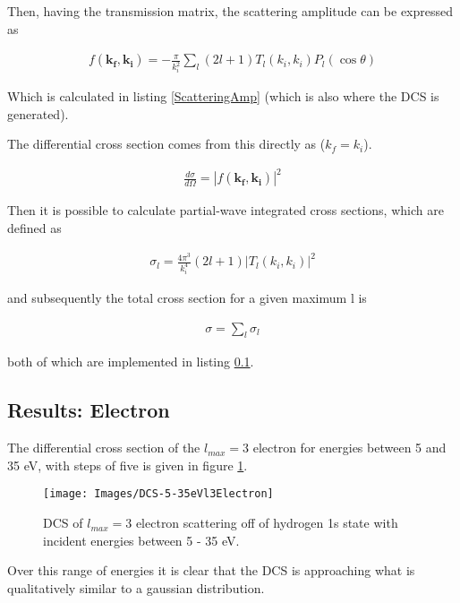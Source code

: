 \documentclass{article}
\renewcommand{\vec}[1]{\mathbf{#1}}
\begin{document}
    Then, having the transmission matrix, the scattering amplitude can be expressed as
    
    \begin{gather}
    	f(\vec{k_f}, \vec{k_i}) = -\frac{\pi}{k_i^2}\sum_{l}(2l+1)T_l(k_i, k_i)P_l(\cos\theta)
    \end{gather}
    
    Which is calculated in listing \ref{ScatteringAmp} (which is also where the DCS is generated).
    
    The differential cross section comes from this directly as ($k_f = k_i$). 
    
    \begin{gather}
    	\frac{d\sigma}{d\Omega} = |f(\vec{k_f}, \vec{k_i})|^2
    \end{gather}
    
    Then it is possible to calculate partial-wave integrated cross sections, which are defined as 
    
    \begin{gather}
    	\sigma_l = \frac{4\pi^3}{k_i^4}(2l+1)|T_l(k_i, k_i)|^2
    \end{gather}
    
    and subsequently the total cross section for a given maximum l is 
    
    \begin{gather}
    	\sigma = \sum_l \sigma_l    
    \end{gather}
    
    both of which are implemented in listing \ref{}. 
    
    \subsection{Results: Electron}
    
    The differential cross section of the $l_{max}=3$ electron for energies between 5 and 35 eV, with steps of five is given in figure \ref{5-35l3Electron}. 
    
    \begin{figure}[H]
    	\centering
    	\texttt{[image: Images/DCS-5-35eVl3Electron]}
    	\caption{DCS of $l_{max}=3$ electron scattering off of hydrogen 1s state with incident energies between 5 - 35 eV. \label{5-35l3Electron}}
    \end{figure}
    
    Over this range of energies it is clear that the DCS is approaching what is qualitatively similar to a gaussian distribution. 
    
\end{document}
